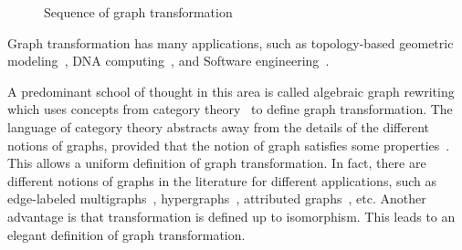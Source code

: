 \begin{figure}[!htbp]
{
}
        \caption{Sequence of graph transformation}
        \label{fig:intro_sequence_of_transformation}
    \end{figure}

 Graph transformation has many applications, such as topology-based geometric modeling~\cite{poudret2007topology, belhaouari2014jerboa, bellet2017geometric, pascale2022Geometric_modeling}, DNA computing~\cite{harju2004tutorial_dna_computation}, and Software engineering~\cite{heckel2020software_engineers}.
 
 A predominant school of thought in this area is called algebraic graph rewriting~\cite{ehrig1997handbook1,ehrig1999handbook2,ehrig1999handbook3} which uses concepts from category theory~\cite{pierce1991basic,barr1990category,maclane2013categories} to define graph transformation. 
 The language of category theory abstracts away from the details of the different notions of graphs, provided that the notion of graph satisfies some properties~\cite{lack2004adhesive,overbeek2023graph}.  
This allows a uniform definition of graph transformation. In fact, there are different notions of graphs in the literature for different applications, such as edge-labeled multigraphs~\cite{konig2018atutorial,corradini1997algebraic}, hypergraphs~\cite{plump1993hypergraph}, attributed graphs~\cite{ehrig2006fundamentals}, etc. 
 Another advantage is that transformation is defined up to isomorphism. 
 This leads to an elegant definition of graph transformation. 

